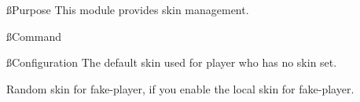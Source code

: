 \ss{Purpose}
This module provides skin management.

\ss{Command}

\ss{Configuration}
The default skin used for player who has no skin set.

Random skin for fake-player, if you enable the local skin for fake-player.